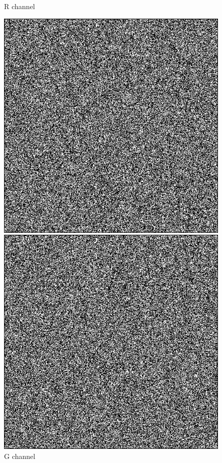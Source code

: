 \begin{figure}[!htb]
  \caption{R channel}
\endminipage\hfill
{}
  \includegraphics[width=\linewidth]{lenablurdiffG.png}
  \caption{G channel}
\endminipage\hfill
{}
  \includegraphics[width=\linewidth]{lenablurdiffB.png}

\end{figure}
